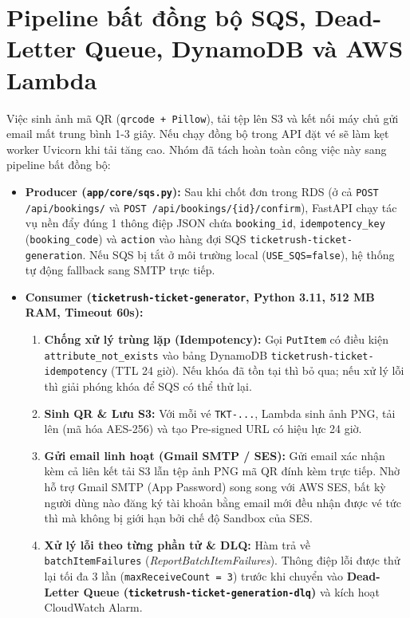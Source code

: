 \section{Pipeline bất đồng bộ SQS, Dead-Letter Queue, DynamoDB và AWS Lambda}
Việc sinh ảnh mã QR (\texttt{qrcode + Pillow}), tải tệp lên S3 và kết nối máy chủ gửi email mất trung bình 1-3 giây. Nếu chạy đồng bộ trong API đặt vé sẽ làm kẹt worker Uvicorn khi tải tăng cao. Nhóm đã tách hoàn toàn công việc này sang pipeline bất đồng bộ:
\begin{itemize}[leftmargin=1.5em]
  \item \textbf{Producer (\texttt{app/core/sqs.py}):} Sau khi chốt đơn trong RDS (ở cả \texttt{POST /api/bookings/} và \texttt{POST /api/bookings/\{id\}/confirm}), FastAPI chạy tác vụ nền đẩy đúng 1 thông điệp JSON chứa \texttt{booking\_id}, \texttt{idempotency\_key} (\texttt{booking\_code}) và \texttt{action} vào hàng đợi SQS \texttt{ticketrush-ticket-generation}. Nếu SQS bị tắt ở môi trường local (\texttt{USE\_SQS=false}), hệ thống tự động fallback sang SMTP trực tiếp.
  \item \textbf{Consumer (\texttt{ticketrush-ticket-generator}, Python 3.11, 512 MB RAM, Timeout 60s):}
    \begin{enumerate}[leftmargin=1.3em]
      \item \textbf{Chống xử lý trùng lặp (Idempotency):} Gọi \texttt{PutItem} có điều kiện \texttt{attribute\_not\_exists} vào bảng DynamoDB \texttt{ticketrush-ticket-idempotency} (TTL 24 giờ). Nếu khóa đã tồn tại thì bỏ qua; nếu xử lý lỗi thì giải phóng khóa để SQS có thể thử lại.
      \item \textbf{Sinh QR \& Lưu S3:} Với mỗi vé \texttt{TKT-...}, Lambda sinh ảnh PNG, tải lên  (mã hóa AES-256) và tạo Pre-signed URL có hiệu lực 24 giờ.
      \item \textbf{Gửi email linh hoạt (Gmail SMTP / SES):} Gửi email xác nhận kèm cả liên kết tải S3 lẫn tệp ảnh PNG mã QR đính kèm trực tiếp. Nhờ hỗ trợ Gmail SMTP (App Password) song song với AWS SES, bất kỳ người dùng nào đăng ký tài khoản bằng email mới đều nhận được vé tức thì mà không bị giới hạn bởi chế độ Sandbox của SES.
      \item \textbf{Xử lý lỗi theo từng phần tử \& DLQ:} Hàm trả về \texttt{batchItemFailures} (\textit{ReportBatchItemFailures}). Thông điệp lỗi được thử lại tối đa 3 lần (\texttt{maxReceiveCount = 3}) trước khi chuyển vào \textbf{Dead-Letter Queue (\texttt{ticketrush-ticket-generation-dlq})} và kích hoạt CloudWatch Alarm.
    \end{enumerate}
\end{itemize}

